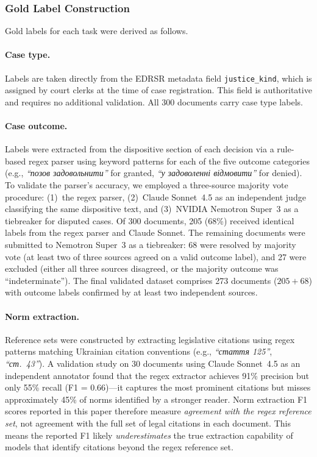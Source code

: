 \documentclass[11pt,a4paper]{article}
\begin{document}
\subsubsection{Gold Label Construction}
\label{sec:gold_labels}

Gold labels for each task were derived as follows.

\paragraph{Case type.} Labels are taken directly from the EDRSR metadata field \texttt{justice\_kind}, which is assigned by court clerks at the time of case registration. This field is authoritative and requires no additional validation. All 300 documents carry case type labels.

\paragraph{Case outcome.} Labels were extracted from the dispositive section of each decision via a rule-based regex parser using keyword patterns for each of the five outcome categories (e.g., \foreignlanguage{ukrainian}{\textit{``позов задовольнити''}} for granted, \foreignlanguage{ukrainian}{\textit{``у задоволенні відмовити''}} for denied). To validate the parser's accuracy, we employed a three-source majority vote procedure: (1)~the regex parser, (2)~Claude Sonnet~4.5 as an independent judge classifying the same dispositive text, and (3)~NVIDIA Nemotron Super~3 as a tiebreaker for disputed cases. Of 300 documents, 205 (68\%) received identical labels from the regex parser and Claude Sonnet. The remaining documents were submitted to Nemotron Super~3 as a tiebreaker: 68 were resolved by majority vote (at least two of three sources agreed on a valid outcome label), and 27 were excluded (either all three sources disagreed, or the majority outcome was ``indeterminate''). The final validated dataset comprises 273 documents ($205 + 68$) with outcome labels confirmed by at least two independent sources.

\paragraph{Norm extraction.} Reference sets were constructed by extracting legislative citations using regex patterns matching Ukrainian citation conventions (e.g., \foreignlanguage{ukrainian}{\textit{``стаття 125''}}, \foreignlanguage{ukrainian}{\textit{``ст.~43''}}). A validation study on 30 documents using Claude Sonnet~4.5 as an independent annotator found that the regex extractor achieves 91\% precision but only 55\% recall (F1 = 0.66)---it captures the most prominent citations but misses approximately 45\% of norms identified by a stronger reader. Norm extraction F1 scores reported in this paper therefore measure \emph{agreement with the regex reference set}, not agreement with the full set of legal citations in each document. This means the reported F1 likely \emph{underestimates} the true extraction capability of models that identify citations beyond the regex reference set.
\end{document}

